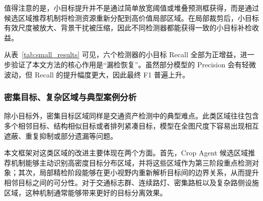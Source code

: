 值得注意的是，小目标提升并不是通过简单放宽阈值或堆叠预测框获得，而是通过候选区域推荐机制将检测资源重新分配到高价值局部区域。在局部裁剪后，小目标有效尺度被放大、背景干扰被压缩，因此不同检测器都能获得一致的小目标补检收益。

\begin{table}[htbp]
    \centering
    \caption{不同检测器在小目标上的性能对比}
    \label{tab:small_results}
\end{table}

从表~\ref{tab:small_results} 可见，六个检测器的小目标 Recall 全部为正增益，进一步验证了本文方法的核心作用是“漏检恢复”。虽然部分模型的 Precision 会有轻微波动，但 Recall 的提升幅度更大，因此最终 F1 普遍上升。

\subsubsection{密集目标、复杂区域与典型案例分析}

除小目标外，密集目标区域同样是交通资产检测中的典型难点。此类区域往往包含多个相邻目标、结构相似目标或者排列紧凑目标，模型在全图尺度下容易出现相互遮蔽、重复抑制或部分遗漏等问题。

本文框架对这类区域的改进主要体现在两个方面。首先，Crop Agent 候选区域推荐机制能够主动识别高密度目标分布区域，并将这些区域作为第三阶段重点检测对象；其次，局部精检阶段能够在更小视野内重新解析目标间的边界关系，从而提升相邻目标之间的可分性。对于交通标志群、连续路灯、密集路桩以及复杂路侧设施区域，这种机制通常能够带来更好的目标分离效果。

